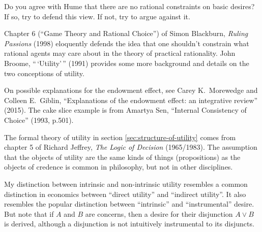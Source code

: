 \begin{essay}
  Do you agree with Hume that there are no rational constraints on
  basic desires? If so, try to defend this view. If not, try to argue
  against it.
\end{essay}

\begin{sources}

  Chapter 6 (``Game Theory and Rational Choice'') of Simon Blackburn,
  \emph{Ruling Passions} (1998) eloquently defends the idea that one shouldn't
  constrain what rational agents may care about in the theory of practical
  rationality. John Broome, ``\,`Utility'\,'' (1991) provides some more
  background and details on the two conceptions of utility.

  On possible explanations for the endowment effect, see Carey K.\ Morewedge and
  Colleen E.\ Giblin, ``Explanations of the endowment effect: an integrative
  review'' (2015). The cake slice example is from Amartya Sen, ``Internal
  Consistency of Choice'' (1993, p.501).

  The formal theory of utility in section \ref{sec:structure-of-utility} comes
  from chapter 5 of Richard Jeffrey, \emph{The Logic of Decision} (1965/1983).
  The assumption that the objects of utility are the same kinds of things
  (propositions) as the objects of credence is common in philosophy, but not in
  other disciplines.
  
  My distinction between intrinsic and non-intrinsic utility resembles a common
  distinction in economics between ``direct utility'' and ``indirect utility''.
  It also resembles the popular distinction between ``intrinsic'' and
  ``instrumental'' desire. But note that if $A$ and $B$ are concerns, then a
  desire for their disjunction $A \lor B$ is derived, although a disjunction is
  not intuitively instrumental to its disjuncts.

\end{sources}

  

